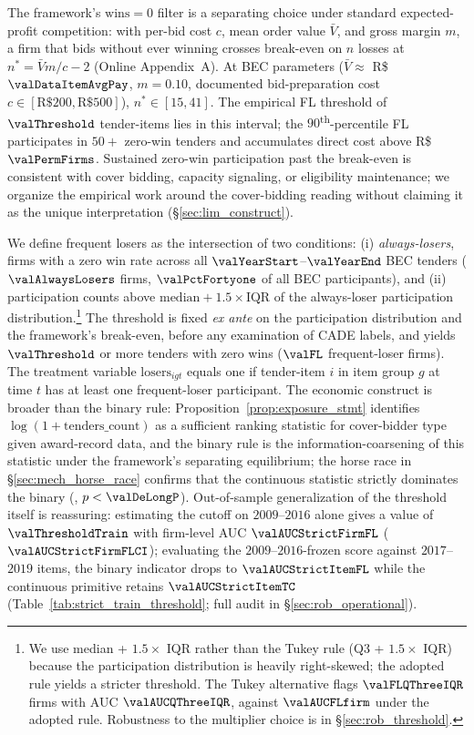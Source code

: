 The framework's $\text{wins}=0$ filter is a separating choice
under standard expected-profit competition: with per-bid cost
$c$, mean order value $\bar V$, and gross margin $m$, a firm
that bids without ever winning crosses break-even on $n$ losses
at $n^{*}=\bar V m / c - 2$ (Online Appendix~A). At BEC parameters
($\bar V \approx$ R\$$\valDataItemAvgPay$, $m=0.10$, documented
bid-preparation cost $c \in [\text{R\$}200,\text{R\$}500]$),
$n^{*}\in[15,41]$. The empirical FL threshold of
$\valThreshold$ tender-items lies in this interval; the
$90$\textsuperscript{th}-percentile FL participates in $50+$
zero-win tenders and accumulates direct cost above
R\$$\valPermFirms$. Sustained zero-win participation past the
break-even is consistent with cover bidding, capacity signaling,
or eligibility maintenance; we organize the empirical work around
the cover-bidding reading without claiming it as the unique
interpretation (\S\ref{sec:lim_construct}).

We define frequent losers as the intersection of two conditions:
(i) \emph{always-losers}, firms with a zero win rate across all
$\valYearStart$--$\valYearEnd$ BEC tenders ($\valAlwaysLosers$
firms, $\valPctFortyone$ of all BEC participants), and
(ii) participation counts above
$\text{median}+1.5\!\times\!\text{IQR}$ of the always-loser
participation distribution.\footnote{We use median + $1.5\!\times$
IQR rather than the Tukey rule (Q3 + $1.5\!\times$ IQR) because
the participation distribution is heavily right-skewed; the
adopted rule yields a stricter threshold. The Tukey alternative
flags $\valFLQThreeIQR$ firms with AUC $\valAUCQThreeIQR$, against
$\valAUCFLfirm$ under the adopted rule. Robustness to the
multiplier choice is in \S\ref{sec:rob_threshold}.} The threshold
is fixed \emph{ex ante} on the participation distribution and
the framework's break-even, before any examination of CADE
labels, and yields $\valThreshold$ or more tenders with zero
wins ($\valFL$ frequent-loser firms). The treatment variable
$\text{losers}_{igt}$ equals one if tender-item $i$ in item
group $g$ at time $t$ has at least one frequent-loser
participant. The economic construct is broader than the binary
rule: Proposition~\ref{prop:exposure_stmt} identifies
$\log(1+\text{tenders\_count})$ as a sufficient ranking statistic
for cover-bidder type given award-record data, and the binary
rule is the information-coarsening of this statistic under the
framework's separating equilibrium; the horse race in
\S\ref{sec:mech_horse_race} confirms that the continuous
statistic strictly dominates the binary
(\citealt{delong1988comparing}, $p < \valDeLongP$). Out-of-sample
generalization of the threshold itself is reassuring: estimating
the cutoff on $2009$--$2016$ alone gives a value of
$\valThresholdTrain$ with firm-level AUC
$\valAUCStrictFirmFL$ ($\valAUCStrictFirmFLCI$); evaluating the
$2009$--$2016$-frozen score against $2017$--$2019$ items, the
binary indicator drops to $\valAUCStrictItemFL$ while the
continuous primitive retains $\valAUCStrictItemTC$
(Table~\ref{tab:strict_train_threshold}; full audit in
\S\ref{sec:rob_operational}).

